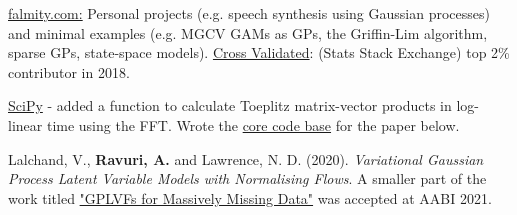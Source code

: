 

\begin{cvskills}

  {\href{https://www.falmity.com}{falmity.com:} Personal projects (e.g. speech synthesis using Gaussian processes) and minimal examples (e.g. MGCV GAMs as GPs, the Griffin-Lim algorithm, sparse GPs, state-space models). \href{https://stats.stackexchange.com/users/211930/infprobscix}{Cross Validated}: (Stats Stack Exchange) top 2\% contributor in 2018.}

  {\href{https://github.com/scipy/scipy/blob/v1.6.0/scipy/linalg/basic.py}{SciPy} - added a function to calculate Toeplitz matrix-vector products in log-linear time using the FFT. \newline Wrote the \href{https://github.com/InfProbSciX/GPLVFs}{core code base} for the paper below.}

  {Lalchand, V., \textbf{Ravuri, A.} and Lawrence, N. D. (2020). \textit{Variational Gaussian Process Latent Variable Models with Normalising Flows}. A smaller part of the work titled \href{https://openreview.net/pdf?id=zaMwvOjsyym}{"GPLVFs for Massively Missing Data"} was accepted at AABI 2021.}


\end{cvskills}




